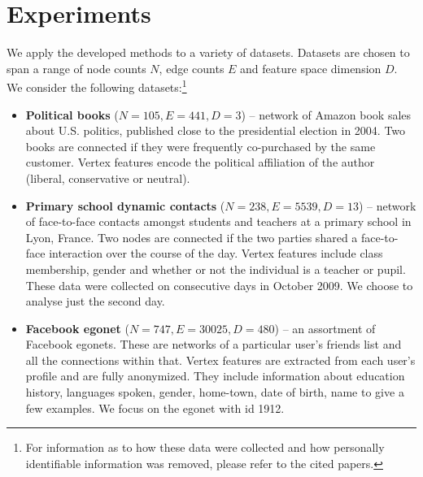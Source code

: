 \section{Experiments}
\label{sec:experiments}

We apply the developed methods to a variety of datasets. Datasets are chosen to span a range of node counts $N$, edge counts $E$ and feature space dimension $D$. We consider the following datasets:\footnote{For information as to how these data were collected and how personally identifiable information was removed, please refer to the cited papers.}

\begin{itemize}
	\item \textbf{Political books} \cite{polbooks} ($N=105, E=441, D=3$) -- network of Amazon book sales about U.S. politics, published close to the presidential election in 2004. Two books are connected if they were frequently co-purchased by the same customer. Vertex features encode the political affiliation of the author (liberal, conservative or neutral).
		
	\item \textbf{Primary school dynamic contacts} \cite{schools} ($N=238, E=5539, D=13$) -- network of face-to-face contacts amongst students and teachers at a primary school in Lyon, France. Two nodes are connected if the two parties shared a face-to-face interaction over the course of the day. Vertex features include class membership, gender and whether or not the individual is a teacher or pupil. These data were collected on consecutive days in October 2009. We choose to analyse just the second day.
	
	\item \textbf{Facebook egonet} \cite{fb-snap} ($N=747, E=30025, D=480$) -- an assortment of Facebook egonets. These are networks of a particular user's friends list and all the connections within that. Vertex features are extracted from each user's profile and are fully anonymized. They include information about education history, languages spoken, gender, home-town, date of birth, name to give a few examples. We focus on the egonet with id 1912.

\end{itemize}

